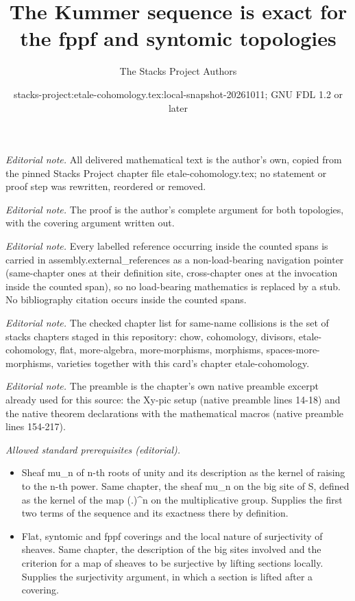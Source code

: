 \documentclass[10pt,a4paper]{amsart}
\title{The Kummer sequence is exact for the fppf and syntomic topologies}
\author{The Stacks Project Authors}
\date{stacks-project:etale-cohomology.tex:local-snapshot-20261011; GNU FDL 1.2 or later}
\theoremstyle{plain}
\theoremstyle{definition}
\theoremstyle{remark}
\numberwithin{equation}{subsection}
\begin{document}
\maketitle
\noindent\textit{Editorial note.} All delivered mathematical text is the author's own, copied from the pinned Stacks Project chapter file etale-cohomology.tex; no statement or proof step was rewritten, reordered or removed.\par\medskip
\noindent\textit{Editorial note.} The proof is the author's complete argument for both topologies, with the covering argument written out.\par\medskip
\noindent\textit{Editorial note.} Every labelled reference occurring inside the counted spans is carried in assembly.external\_references as a non-load-bearing navigation pointer (same-chapter ones at their definition site, cross-chapter ones at the invocation inside the counted span), so no load-bearing mathematics is replaced by a stub. No bibliography citation occurs inside the counted spans.\par\medskip
\noindent\textit{Editorial note.} The checked chapter list for same-name collisions is the set of stacks chapters staged in this repository: chow, cohomology, divisors, etale-cohomology, flat, more-algebra, more-morphisms, morphisms, spaces-more-morphisms, varieties together with this card's chapter etale-cohomology.\par\medskip
\noindent\textit{Editorial note.} The preamble is the chapter's own native preamble excerpt already used for this source: the Xy-pic setup (native preamble lines 14-18) and the native theorem declarations with the mathematical macros (native preamble lines 154-217).\par\medskip
\noindent\textit{Allowed standard prerequisites (editorial).}\begin{itemize}
\item Sheaf mu\_n of n-th roots of unity and its description as the kernel of raising to the n-th power. Same chapter, the sheaf mu\_n on the big site of S, defined as the kernel of the map (.)\textasciicircum{}n on the multiplicative group. Supplies the first two terms of the sequence and its exactness there by definition.
\item Flat, syntomic and fppf coverings and the local nature of surjectivity of sheaves. Same chapter, the description of the big sites involved and the criterion for a map of sheaves to be surjective by lifting sections locally. Supplies the surjectivity argument, in which a section is lifted after a covering.
\end{itemize}\medskip
\end{document}
